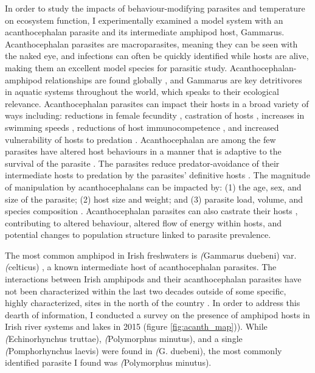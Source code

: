 In order to study the impacts of behaviour-modifying parasites and temperature on ecosystem function, I experimentally examined a model system with an acanthocephalan parasite and its intermediate amphipod host, Gammarus. Acanthocephalan parasites are macroparasites, meaning they can be seen with the naked eye, and infections can often be quickly identified while hosts are alive, making them an excellent model species for parasitic study. Acanthocephalan-amphipod relationships are found globally \citep{hynes1958, tokeson1982}, and Gammarus are key detritivores in aquatic systems throughout the world, which speaks to their ecological relevance. Acanthocephalan parasites can impact their hosts in a broad variety of ways including: reductions in female fecundity \citep{dezfuli1999}, castration of hosts \citep{bailly2017}, increases in swimming speeds \citep{medoc2008}, reductions of host immunocompetence \citep{rigaud2003}, and increased vulnerability of hosts  to predation \citep{lagrue2007}. Acanthocephalan are among the few parasites have altered host behaviours in a manner that is adaptive to the survival of the parasite \citep{poulin1995}. The parasites reduce predator-avoidance of their intermediate hosts to predation by the parasites’ definitive hosts \citep{jacquin2014}. The magnitude of manipulation by acanthocephalans can be impacted by: (1) the age, sex, and size of the parasite; (2) host size and weight; and (3) parasite load, volume, and species composition \citep{labaude2015}. Acanthocephalan parasites can also castrate their hosts \citep{bailly2017, kakizaki2003}, contributing to altered behaviour, altered flow of energy within hosts, and potential changes to population structure linked to parasite prevalence. 

The most common amphipod in Irish freshwaters is \emph(Gammarus duebeni) var. \emph(celticus) \citep{macneil2009, reid1938}, a known intermediate host of acanthocephalan parasites. The interactions between Irish amphipods and their acanthocephalan parasites have not been characterized within the last two decades outside of some specific, highly characterized, sites in the north of the country \citep{dick1993, dunn1998, lyndon1996}. In order to address this dearth of information, I conducted a survey on the presence of amphipod hosts in Irish river systems and lakes in 2015 (figure \ref{fig:acanth_map})). While \emph(Echinorhynchus truttae), \emph(Polymorphus minutus), and a single \emph(Pomphorhynchus laevis) were found in \emph(G. duebeni), the most commonly identified parasite I found was \emph(Polymorphus minutus). 

